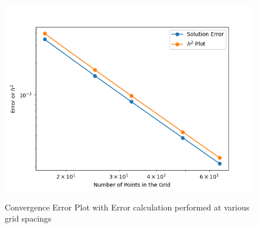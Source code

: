 \documentclass[12pt,dvipsnames]{article}
\begin{document}
\begin{figure}
\centering
    {\includegraphics[width=14cm]{Error_Plot.png} }%
    \caption{Convergence Error Plot with Error calculation performed at various grid spacings}%
    \label{errorplot}
\end{figure}
\end{document}
